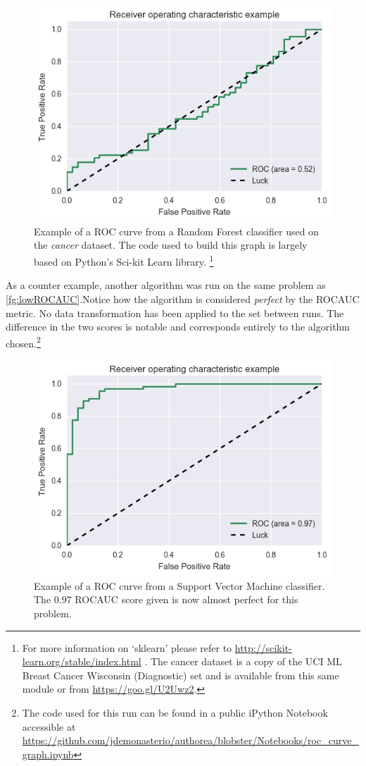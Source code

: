 \begin{figure}[h!]
\begin{center}
\includegraphics[width=0.7\columnwidth]{figures/figure-lowROCAUC/figure-lowROCAUC_original}
\caption{Example of a ROC curve from a Random Forest classifier used on the \textit{cancer} dataset. The code used to build this graph is largely based on Python's Sci-kit Learn library. \protect\footnote{For more information on `sklearn' please refer to \url{http://scikit-learn.org/stable/index.html} \protect\textcite{scikit-learn}. The cancer dataset is a copy of the UCI ML Breast Cancer Wisconsin (Diagnostic) set and is available from this same module or from \url{https://goo.gl/U2Uwz2}.} }
\end{center}
\end{figure}\label{fg:lowROCAUC}
%

As a counter example, another algorithm was run on the same problem as \cref{fg:lowROCAUC}.Notice how the algorithm is considered \textit{perfect} by the ROCAUC metric. No data transformation has been applied to the set between runs. The difference in the two scores is notable and corresponds entirely to the algorithm chosen.\footnote{The code used for this run can be found in a public iPython Notebook accessible at \url{https://github.com/jdemonasterio/authorea/blobster/Notebooks/roc_curve_graph.ipynb}}

\begin{figure}[h!]
\begin{center}
\includegraphics[width=0.7\columnwidth]{figures/figure-highROCAUC/figure-highROCAUC}
\caption{Example of a ROC curve from a Support Vector Machine classifier. The $0.97$ ROCAUC score given is now almost perfect for this problem.%
}
\end{center}
\end{figure}

